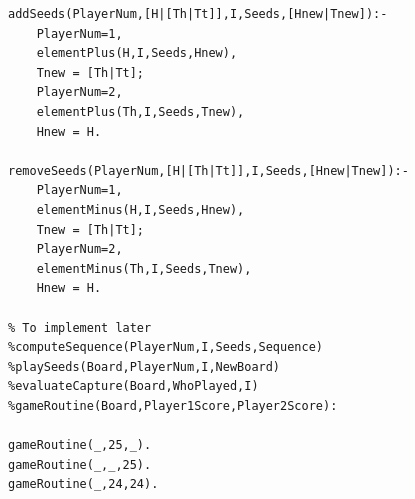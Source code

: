 \documentclass[15pt,a4paper]{article}
\begin{document}
\begin{verbatim}
addSeeds(PlayerNum,[H|[Th|Tt]],I,Seeds,[Hnew|Tnew]):-
	PlayerNum=1,
	elementPlus(H,I,Seeds,Hnew),
	Tnew = [Th|Tt];
	PlayerNum=2,
	elementPlus(Th,I,Seeds,Tnew),
	Hnew = H.
	
removeSeeds(PlayerNum,[H|[Th|Tt]],I,Seeds,[Hnew|Tnew]):-
	PlayerNum=1,
	elementMinus(H,I,Seeds,Hnew),
	Tnew = [Th|Tt];
	PlayerNum=2,
	elementMinus(Th,I,Seeds,Tnew),
	Hnew = H.
		
% To implement later
%computeSequence(PlayerNum,I,Seeds,Sequence)
%playSeeds(Board,PlayerNum,I,NewBoard)
%evaluateCapture(Board,WhoPlayed,I)
%gameRoutine(Board,Player1Score,Player2Score):

gameRoutine(_,25,_).
gameRoutine(_,_,25).
gameRoutine(_,24,24).

\end{verbatim}
\end{document}
